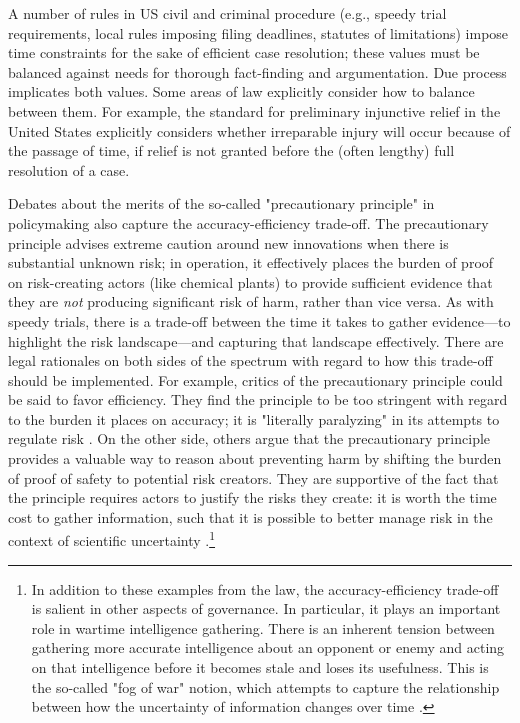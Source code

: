 \documentclass[sigplan,screen]{acmart}
\begin{document}
A number of rules in US civil and criminal procedure (e.g., speedy trial requirements, local rules imposing filing deadlines, statutes of limitations) impose time constraints for the sake of efficient case resolution; these values must be balanced against needs for thorough fact-finding and argumentation. Due process implicates both values. Some areas of law explicitly consider how to balance between them. For example, the standard for preliminary injunctive relief in the United States explicitly considers whether irreparable injury will occur because of the passage of time, if relief is not granted before the (often lengthy) full resolution of a case.

Debates about the merits of the so-called "precautionary principle" in policymaking also capture the accuracy-efficiency trade-off. The precautionary principle advises extreme caution around new innovations when there is substantial unknown risk; in operation, it effectively places the burden of proof on risk-creating actors (like chemical plants) to provide sufficient evidence that they are \emph{not} producing significant risk of harm, rather than vice versa. As with speedy trials, there is a trade-off between the time it takes to gather evidence---to highlight the risk landscape---and capturing that landscape effectively. There are legal rationales on both sides of the spectrum with regard to how this trade-off should be implemented. For example, critics of the precautionary principle could be said to favor efficiency. They find the principle to be too stringent with regard to the burden it places on accuracy; it is "literally paralyzing" in its attempts to regulate risk  \cite{sunstein2003precaution}. On the other side, others argue that the precautionary principle provides a valuable way to reason about preventing harm by shifting the burden of proof of safety to potential risk creators. They are supportive of the fact that the principle requires actors to justify the risks they create: it is worth the time cost to gather information, such that it is possible to better manage risk in the context of scientific uncertainty \cite{sachs2011precaution}.\footnote{In addition to these examples from the law, the accuracy-efficiency trade-off is salient in other aspects of governance. In particular, it plays an important role in wartime intelligence gathering. There is an inherent tension between gathering more accurate intelligence about an opponent or enemy and acting on that intelligence before it becomes stale and loses its usefulness. This is the so-called "fog of war" notion, which attempts to capture the relationship between how the uncertainty of information changes over time \cite{Clausewitz1832fog}.}
\end{document}
